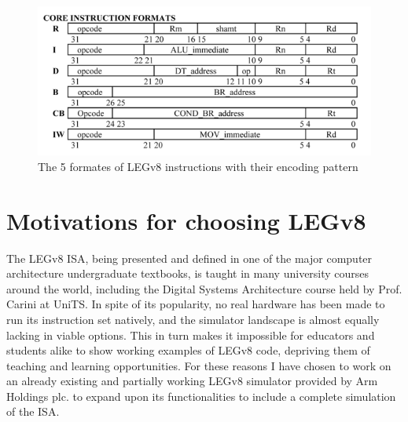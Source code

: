 \begin{figure}[H]
	\centering
	\includegraphics[width=.8\textwidth]{img/instruction_types.png}
	\caption{The 5 formates of LEGv8 instructions with their encoding pattern}
\end{figure}
\section*{Motivations for choosing LEGv8}
The LEGv8 ISA, being presented and defined in one of the major computer architecture undergraduate textbooks, is taught in many university courses around the world, including the Digital Systems Architecture course held by Prof. Carini at UniTS. In spite of its popularity, no real hardware has been made to run its instruction set natively, and the simulator landscape is almost equally lacking in viable options. This in turn makes it impossible for educators and students alike to show working examples of LEGv8 code, depriving them of teaching and learning opportunities. For these reasons I have chosen to work on an already existing and partially working LEGv8 simulator provided by Arm Holdings plc. to expand upon its functionalities to include a complete simulation of the ISA. 


